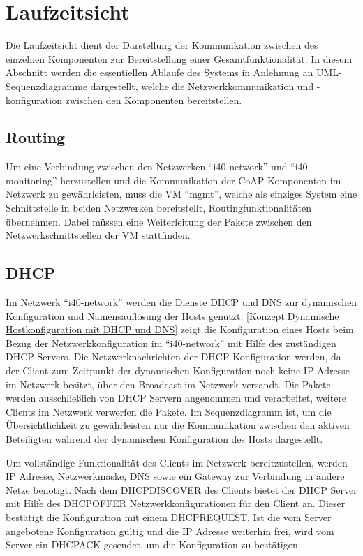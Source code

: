 \section{Laufzeitsicht}
Die Laufzeitsicht dient der Darstellung der Kommunikation zwischen des einzelnen Komponenten zur Bereitstellung einer Gesamtfunktionalität. In diesem Abschnitt werden die essentiellen Ablaufe des Systems in Anlehnung an \ac{UML}-Sequenzdiagramme dargestellt, welche die Netzwerkkommunikation und -konfiguration zwischen den Komponenten bereitstellen.

\subsection{Routing}
Um eine Verbindung zwischen den Netzwerken "`i40-network"' und "`i40-monitoring"' herzustellen und die Kommunikation der \ac{CoAP} Komponenten im Netzwerk zu gewährleisten, muss die \ac{VM} "`mgmt"', welche als einziges System eine Schnittstelle in beiden Netzwerken bereitstellt, Routingfunktionalitäten übernehmen. Dabei müssen eine Weiterleitung der Pakete zwischen den Netzwerkschnittstellen der \ac{VM} stattfinden.

\subsection{\ac{DHCP}}
Im Netzwerk "`i40-network"' werden die Dienste \ac{DHCP} und \ac{DNS} zur dynamischen Konfiguration und Namensauflösung der Hosts genutzt. \autoref{Konzept:Dynamische Hostkonfiguration mit DHCP und DNS} zeigt die Konfiguration eines Hosts beim Bezug der Netzwerkkonfiguration im "`i40-network"' mit Hilfe des zuständigen \ac{DHCP} Servers. Die Netzwerknachrichten der \ac{DHCP} Konfiguration werden, da der Client zum Zeitpunkt der dynamischen Konfiguration noch keine \ac{IP} Adresse im Netzwerk besitzt, über den Broadcast im Netzwerk versandt. Die Pakete werden ausschließlich von \ac{DHCP} Servern angenommen und verarbeitet, weitere Clients im Netzwerk verwerfen die Pakete. Im Sequenzdiagramm ist, um die Übersichtlichkeit zu gewährleisten nur die Kommunikation zwischen den aktiven Beteiligten während der dynamischen Konfiguration des Hosts dargestellt.

Um vollständige Funktionalität des Clients im Netzwerk bereitzustellen, werden \ac{IP} Adresse, Netzwerkmaske, \ac{DNS} sowie ein Gateway zur Verbindung in andere Netze benötigt. Nach dem DHCPDISCOVER des Clients bietet der \ac{DHCP} Server mit Hilfe des DHCPOFFER Netzwerkkonfigurationen für den Client an. Dieser bestätigt die Konfiguration mit einem DHCPREQUEST. Ist die vom Server angebotene Konfiguration gültig und die \ac{IP} Adresse weiterhin frei, wird vom Server ein DHCPACK gesendet, um die Konfiguration zu bestätigen.

